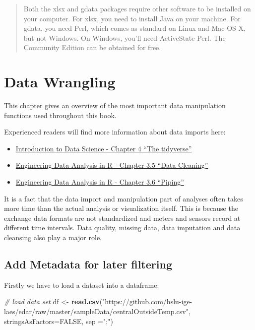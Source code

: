 \documentclass[
]{book}
\newenvironment{Shaded}{\begin{snugshade}}{\end{snugshade}}
\newcommand{\CommentTok}[1]{\textcolor[rgb]{0.56,0.35,0.01}{\textit{#1}}}
\newcommand{\DataTypeTok}[1]{\textcolor[rgb]{0.13,0.29,0.53}{#1}}
\newcommand{\KeywordTok}[1]{\textcolor[rgb]{0.13,0.29,0.53}{\textbf{#1}}}
\newcommand{\NormalTok}[1]{#1}
\newcommand{\OtherTok}[1]{\textcolor[rgb]{0.56,0.35,0.01}{#1}}
\newcommand{\StringTok}[1]{\textcolor[rgb]{0.31,0.60,0.02}{#1}}
\let\oldShaded\Shaded
\let\endoldShaded\endShaded
\renewenvironment{Shaded}{\footnotesize\oldShaded}{\endoldShaded}
\begin{document}
\begin{quote}
Both the xlsx and gdata packages require other software to be installed on your computer. For xlsx, you need to install Java on your machine. For gdata, you need Perl, which comes as standard on Linux and Mac OS X, but not Windows. On Windows, you'll need ActiveState Perl. The Community Edition can be obtained for free.
\end{quote}

\hypertarget{data-wrangling}{%
\chapter{Data Wrangling}\label{data-wrangling}}

This chapter gives an overview of the most important data manipulation functions used throughout this book.

Experienced readers will find more information about data imports here:

\begin{itemize}
\item
  \href{https://rafalab.github.io/dsbook/tidyverse.html\#summarizing-data}{Introduction to Data Science - Chapter 4 ``The tidyverse''}
\item
  \href{https://smogdr.github.io/edar_coursebook/rprog2.html\#data-cleaning}{Engineering Data Analysis in R - Chapter 3.5 ``Data Cleaning''}
\item
  \href{https://smogdr.github.io/edar_coursebook/rprog2.html\#piping}{Engineering Data Analysis in R - Chapter 3.6 ``Piping''}
\end{itemize}

It is a fact that the data import and manipulation part of analyses often takes more time than the actual analysis or visualization itself. This is because the exchange data formats are not standardized and meters and sensors record at different time intervals. Data quality, missing data, data imputation and data cleansing also play a major role.

\hypertarget{add-metadata-for-later-filtering}{%
\section{Add Metadata for later filtering}\label{add-metadata-for-later-filtering}}

Firstly we have to load a dataset into a dataframe:

\begin{Shaded}
\begin{Highlighting}[]
\CommentTok{# load data set}
\NormalTok{df <-}\StringTok{ }\KeywordTok{read.csv}\NormalTok{(}\StringTok{"https://github.com/hslu-ige-laes/edar/raw/master/sampleData/centralOutsideTemp.csv"}\NormalTok{,}
               \DataTypeTok{stringsAsFactors=}\OtherTok{FALSE}\NormalTok{,}
               \DataTypeTok{sep =}\StringTok{";"}\NormalTok{)}
\end{Highlighting}
\end{Shaded}
\end{document}
